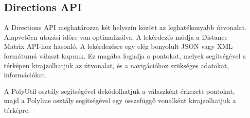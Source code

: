 \subsection{Directions API}

A Directions API\cite{directions} meghatározza két helyszín között az leghatékonyabb útvonalat. Alapvetően utazási időre van optimalizálva. A lekérdezés módja a Distance Matrix API-hoz hasonló. A lekérdezésre egy elég bonyolult JSON vagy XML formátumú választ kapunk. Ez magába foglalja a pontokat, melyek segítségével a térképen kirajzolhatjuk az útvonalat, és a navigációhoz szükséges adatokat, információkat.

A PolyUtil osztály segítségével dekódolhatjuk a válaszként érkezett pontokat, majd a Polyline osztály segítségével egy összefüggő vonalként kirajzolhatjuk a térképre.




